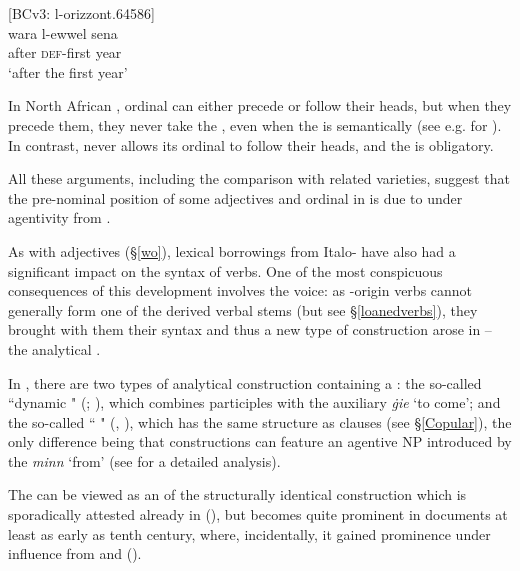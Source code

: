 \documentclass[output=paper]{langsci/langscibook}
\begin{document}
\ea\label{wo2}
	{[BCv3: l-orizzont.64586]}\\
	\gll wara l-ewwel sena\\
	after \textsc{def}-first year\\
	\glt `after the first year'\\
\z

In North African , ordinal  can either precede or follow their heads, but when they precede them, they never take the  , even when the  is semantically  (see e.g. \citealt[284]{Ritt-Benmimoun2014} for  ). In contrast,  never allows its ordinal  to follow their heads, and the   is obligatory.

All these arguments, including the comparison with related  varieties, suggest that the pre-nominal position of some adjectives and ordinal  in  is due to  under  agentivity from .

As with adjectives (§\ref{wo}), lexical borrowings from Italo- have also had a significant impact on the syntax of  verbs. One of the most conspicuous consequences of this development involves the  voice: as -origin verbs cannot generally form one of the  derived verbal stems (but see §\ref{loanedverbs}), they brought with them their  syntax and thus a new type of  construction arose in  -- the analytical .

In , there are two types of analytical  construction containing a  : the so-called ``dynamic " (\citealt[321--324]{Vanhove1993}; \citealt[214]{BorgAzzopardi-Alexander1997}), which combines  participles with the  auxiliary \textit{ġie} `to come'; and the so-called `` " (\citealt[214]{BorgAzzopardi-Alexander1997}, \citealt[318--320]{Vanhove1993}), which has the same structure as  clauses (see §\ref{Copular}), the only difference being that   constructions can feature an agentive NP introduced by the  \textit{minn} `from' (see \citealt[104--107]{bulbul2018} for a detailed analysis).

The   can be viewed as an  of the structurally identical construction which is sporadically attested already in   (\citealt[76--84]{Ullmann1989}), but becomes quite prominent in   documents at least as early as tenth century, where, incidentally, it gained prominence under influence from  and  (\citealt[424]{Blau1967}).
\end{document}
